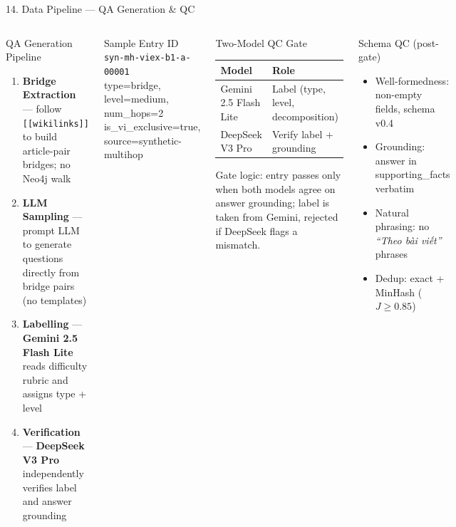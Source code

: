 \documentclass[aspectratio=169]{beamer}
\begin{document}
\begin{frame}[shrink=10]{14. Data Pipeline — QA Generation \& QC}
\begin{columns}[T]
\begin{block}{QA Generation Pipeline}
\begin{enumerate}\small\setlength\itemsep{3pt}
  \item \textbf{Bridge Extraction} --- follow \texttt{[[wikilinks]]} to build article-pair bridges; no Neo4j walk
  \item \textbf{LLM Sampling} --- prompt LLM to generate questions directly from bridge pairs (no templates)
  \item \textbf{Labelling} --- \textbf{Gemini 2.5 Flash Lite} reads difficulty rubric and assigns type + level
  \item \textbf{Verification} --- \textbf{DeepSeek V3 Pro} independently verifies label and answer grounding
\end{enumerate}
\end{block}

\begin{exampleblock}{Sample Entry ID}
{\scriptsize \texttt{syn-mh-viex-b1-a-00001}\\
type=bridge, level=medium, num\_hops=2\\
is\_vi\_exclusive=true, source=synthetic-multihop}
\end{exampleblock}

\begin{block}{Two-Model QC Gate}
\begin{tabular}{@{}lp{2.8cm}@{}}
\toprule
\textbf{Model} & \textbf{Role} \\
\midrule
Gemini 2.5 Flash Lite & Label (type, level, decomposition) \\
DeepSeek V3 Pro       & Verify label + grounding \\
\bottomrule
\end{tabular}
\smallskip

{\scriptsize Gate logic: entry passes only when both models agree on answer grounding; label is taken from Gemini, rejected if DeepSeek flags a mismatch.}
\end{block}

\begin{block}{Schema QC (post-gate)}
\begin{itemize}\scriptsize\setlength\itemsep{1pt}
  \item Well-formedness: non-empty fields, schema v0.4
  \item Grounding: answer in supporting\_facts verbatim
  \item Natural phrasing: no \textit{``Theo bài viết''} phrases
  \item Dedup: exact + MinHash ($J \geq 0.85$)
\end{itemize}
\end{block}
\end{columns}
\end{frame}
\end{document}
